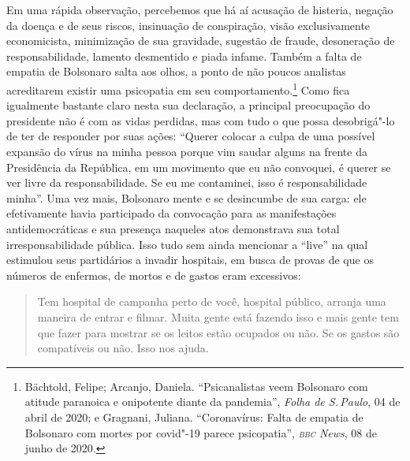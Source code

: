 Em uma rápida observação, percebemos que há aí acusação de histeria,
negação da doença e de seus riscos, insinuação de conspiração, visão
exclusivamente economicista, minimização de sua gravidade, sugestão de
fraude, desoneração de responsabilidade, lamento desmentido e piada
infame. Também a falta de empatia de Bolsonaro salta aos olhos, a ponto
de não poucos analistas acreditarem existir uma psicopatia em seu
comportamento.\footnote{Bächtold, Felipe; Arcanjo, Daniela. ``Psicanalistas
  veem Bolsonaro com atitude paranoica e onipotente diante da pandemia'',
  \textit{Folha de S.\,Paulo}, 04 de abril de 2020;
  e Gragnani, Juliana. ``Coronavírus: Falta de empatia de
  Bolsonaro com mortes por covid"-19 parece psicopatia'', \textit{\textsc{bbc} News}, 08 de junho de 2020.}
Como fica igualmente bastante claro nesta sua declaração, a principal
preocupação do presidente não é com as vidas perdidas, mas com tudo o
que possa desobrigá"-lo de ter de responder por suas ações: ``Querer
colocar a culpa de uma possível expansão do vírus na minha pessoa porque
vim saudar alguns na frente da Presidência da República, em um movimento
que eu não convoquei, é querer se ver livre da responsabilidade. Se eu
me contaminei, isso é responsabilidade minha''. Uma vez mais, Bolsonaro
mente e se desincumbe de sua carga: ele efetivamente havia participado
da convocação para as manifestações antidemocráticas e sua presença
naqueles atos demonstrava sua total irresponsabilidade pública. Isso
tudo sem ainda mencionar a ``live'' na qual estimulou seus partidários a
invadir hospitais, em busca de provas de que os números de enfermos, de
mortos e de gastos eram excessivos:

\begin{quote}
Tem hospital de campanha perto de você, hospital público, arranja uma
maneira de entrar e filmar. Muita gente está fazendo isso e mais gente
tem que fazer para mostrar se os leitos estão ocupados ou não. Se os
gastos são compatíveis ou não. Isso nos ajuda.
\end{quote}

